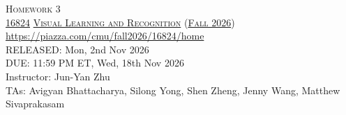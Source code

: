 \documentclass[11pt,addpoints,answers]{exam}
\title{\textsc{\hwName}} %
\author{}
\date{}
\date{}
\numberwithin{equation}{section} %
\numberwithin{figure}{section} %
\numberwithin{table}{section} %
\newcommand{\courseNum}{\href{https://visual-learning.cs.cmu.edu/}{16824}}
\newcommand{\courseName}{\href{https://visual-learning.cs.cmu.edu/}{Visual Learning and Recognition}}
\newcommand{\courseSem}{\href{https://visual-learning.cs.cmu.edu/}{Fall 2026}}
\newcommand{\courseUrl}{\url{https://piazza.com/cmu/fall2026/16824/home}}
\newcommand{\hwNum}{Homework 3}
\newcommand{\hwTopic}{Transformers}
\newcommand{\outDate}{Mon, 2nd Nov 2026}
\newcommand{\dueDate}{11:59 PM ET, Wed, 18th Nov 2026}
\newcommand{\instructorName}{Jun-Yan Zhu}
\newcommand{\taNames}{{Avigyan Bhattacharya, Silong Yong, Shen Zheng, Jenny Wang, Matthew Sivaprakasam}}
\begin{document}
\section*{}
\begin{center}
  \textsc{\LARGE \hwNum} \\
  \vspace{1em}
  \textsc{\large \courseNum{} \courseName{} (\courseSem)} \\
  \courseUrl\\
  \vspace{1em}
  RELEASED: \outDate \\
  DUE: \dueDate \\
  Instructor: \instructorName \\
  TAs: \taNames
\end{center}
\end{document}
